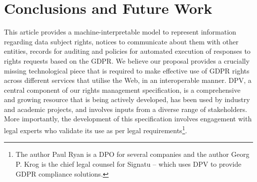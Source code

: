 \documentclass{IOS-Book-Article}     %
\begin{document}

\section{Conclusions and Future Work}
\label{sec:conclusions}

This article provides a machine-interpretable model to represent information regarding data subject rights, 
notices to communicate about them with other entities, records for auditing and policies for automated execution of responses to rights requests based on the GDPR.
We believe our proposal provides a crucially missing technological piece that is required to make effective use of GDPR rights across different services that utilise the Web, in an interoperable manner.
DPV, a central component of our rights management specification, is a comprehensive and growing resource that is being actively developed, has been used by industry and academic projects, and involves inputs from a diverse range of stakeholders.
More importantly, the development of this specification involves engagement with legal experts who validate its use as per legal requirements\footnote{
The author Paul Ryan is a DPO for several companies and the author Georg P. Krog is the chief legal counsel for Signatu -- which uses DPV to provide GDPR compliance solutions.}.

\end{document}
